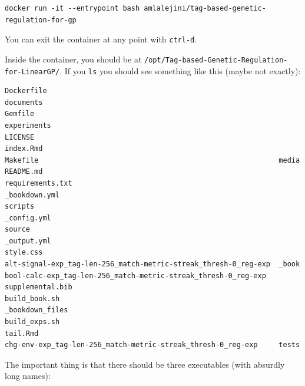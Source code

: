 \documentclass[
]{book}
\begin{document}
\begin{verbatim}
docker run -it --entrypoint bash amlalejini/tag-based-genetic-regulation-for-gp
\end{verbatim}

You can exit the container at any point with \texttt{ctrl-d}.

Inside the container, you should be at \texttt{/opt/Tag-based-Genetic-Regulation-for-LinearGP/}.
If you \texttt{ls} you should see something like this (maybe not exactly):

\begin{verbatim}
Dockerfile                                                       documents
Gemfile                                                          experiments
LICENSE                                                          index.Rmd
Makefile                                                         media
README.md                                                        requirements.txt
_bookdown.yml                                                    scripts
_config.yml                                                      source
_output.yml                                                      style.css
alt-signal-exp_tag-len-256_match-metric-streak_thresh-0_reg-exp  _book
bool-calc-exp_tag-len-256_match-metric-streak_thresh-0_reg-exp   supplemental.bib
build_book.sh                                                    _bookdown_files
build_exps.sh                                                    tail.Rmd
chg-env-exp_tag-len-256_match-metric-streak_thresh-0_reg-exp     tests
\end{verbatim}

The important thing is that there should be three executables (with absurdly long names):
\end{document}
